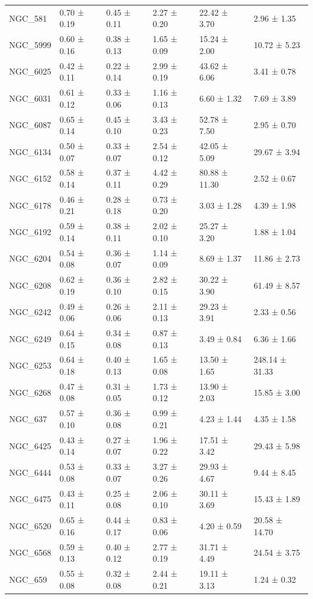 \begin{tabular}{llllll}
NGC_581 & 0.70 ± 0.19 & 0.45 ± 0.11 & 2.27 ± 0.20 & 22.42 ± 3.70 & 2.96 ± 1.35 \\
NGC_5999 & 0.60 ± 0.16 & 0.38 ± 0.13 & 1.65 ± 0.09 & 15.24 ± 2.00 & 10.72 ± 5.23 \\
NGC_6025 & 0.42 ± 0.11 & 0.22 ± 0.14 & 2.99 ± 0.19 & 43.62 ± 6.06 & 3.41 ± 0.78 \\
NGC_6031 & 0.61 ± 0.12 & 0.33 ± 0.06 & 1.16 ± 0.13 & 6.60 ± 1.32 & 7.69 ± 3.89 \\
NGC_6087 & 0.65 ± 0.14 & 0.45 ± 0.10 & 3.43 ± 0.23 & 52.78 ± 7.50 & 2.95 ± 0.70 \\
NGC_6134 & 0.50 ± 0.07 & 0.33 ± 0.07 & 2.54 ± 0.12 & 42.05 ± 5.09 & 29.67 ± 3.94 \\
NGC_6152 & 0.58 ± 0.14 & 0.37 ± 0.11 & 4.42 ± 0.29 & 80.88 ± 11.30 & 2.52 ± 0.67 \\
NGC_6178 & 0.46 ± 0.21 & 0.28 ± 0.18 & 0.73 ± 0.20 & 3.03 ± 1.28 & 4.39 ± 1.98 \\
NGC_6192 & 0.59 ± 0.14 & 0.38 ± 0.11 & 2.02 ± 0.10 & 25.27 ± 3.20 & 1.88 ± 1.04 \\
NGC_6204 & 0.54 ± 0.08 & 0.36 ± 0.07 & 1.14 ± 0.09 & 8.69 ± 1.37 & 11.86 ± 2.73 \\
NGC_6208 & 0.62 ± 0.19 & 0.36 ± 0.10 & 2.82 ± 0.15 & 30.22 ± 3.90 & 61.49 ± 8.57 \\
NGC_6242 & 0.49 ± 0.06 & 0.26 ± 0.06 & 2.11 ± 0.13 & 29.23 ± 3.91 & 2.33 ± 0.56 \\
NGC_6249 & 0.64 ± 0.15 & 0.34 ± 0.08 & 0.87 ± 0.13 & 3.49 ± 0.84 & 6.36 ± 1.66 \\
NGC_6253 & 0.64 ± 0.18 & 0.40 ± 0.13 & 1.65 ± 0.08 & 13.50 ± 1.65 & 248.14 ± 31.33 \\
NGC_6268 & 0.47 ± 0.08 & 0.31 ± 0.05 & 1.73 ± 0.12 & 13.90 ± 2.03 & 15.85 ± 3.00 \\
NGC_637 & 0.57 ± 0.10 & 0.36 ± 0.08 & 0.99 ± 0.21 & 4.23 ± 1.44 & 4.35 ± 1.58 \\
NGC_6425 & 0.43 ± 0.14 & 0.27 ± 0.07 & 1.96 ± 0.22 & 17.51 ± 3.42 & 29.43 ± 5.98 \\
NGC_6444 & 0.53 ± 0.08 & 0.33 ± 0.07 & 3.27 ± 0.26 & 29.93 ± 4.67 & 9.44 ± 8.45 \\
NGC_6475 & 0.43 ± 0.11 & 0.25 ± 0.08 & 2.06 ± 0.10 & 30.11 ± 3.69 & 15.43 ± 1.89 \\
NGC_6520 & 0.65 ± 0.16 & 0.44 ± 0.17 & 0.83 ± 0.06 & 4.20 ± 0.59 & 20.58 ± 14.70 \\
NGC_6568 & 0.59 ± 0.13 & 0.40 ± 0.12 & 2.77 ± 0.19 & 31.71 ± 4.49 & 24.54 ± 3.75 \\
NGC_659 & 0.55 ± 0.08 & 0.32 ± 0.08 & 2.44 ± 0.21 & 19.11 ± 3.13 & 1.24 ± 0.32 \\

\end{tabular}
